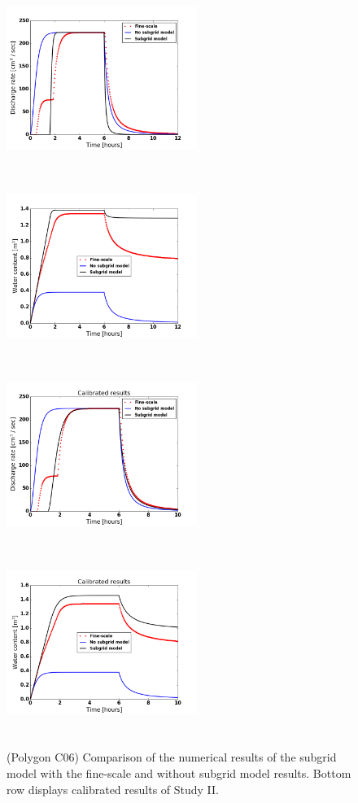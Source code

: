 \documentclass[review,11pt]{elsarticle}
\begin{document}
\begin{figure}
\centering
\includegraphics[width=6.2cm, height=6cm]{./figures/POLYGON06/POLYGON06discharge.png}
\includegraphics[width=6.2cm, height=6cm]{./figures/POLYGON06/POLYGON06watercontent.png}\\
\includegraphics[width=6.2cm, height=6cm]{./figures/POLYGON06/POLYGON06dischargeCalibDDManning.png}
\includegraphics[width=6.2cm, height=6cm]{./figures/POLYGON06/POLYGON06watercontentCalibDDManning.png}
\caption{(Polygon C06) Comparison of the numerical results of the subgrid model with the fine-scale and without subgrid model results. Bottom row displays calibrated results of Study II.}
\label{polygon-C06}
\end{figure}
\end{document}

